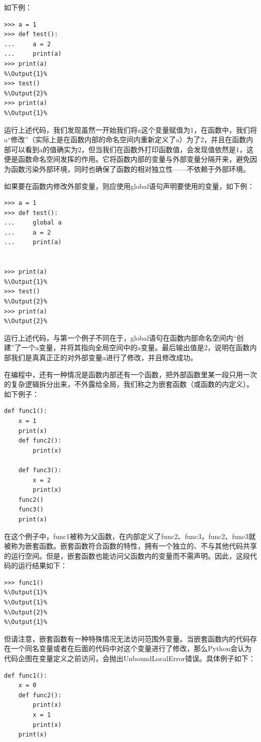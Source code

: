 \documentclass[../../Main.tex]{subfiles}
\begin{document}
如下例：
\begin{lstlisting}
>>> a = 1
>>> def test():
...     a = 2
...     print(a)
>>> print(a)
%\Output{1}%
>>> test()
%\Output{2}%
>>> print(a)
%\Output{1}%
\end{lstlisting}

运行上述代码，我们发现虽然一开始我们将a这个变量赋值为1，在函数中，我们将a“修改”（实际上是在函数内部的命名空间内重新定义了a）为了2，并且在函数内部可以看到a的值确实为2，但当我们在函数外打印函数值，会发现值依然是1，这便是函数命名空间发挥的作用。它将函数内部的变量与外部变量分隔开来，避免因为函数污染外部环境，同时也确保了函数的相对独立性——不依赖于外部环境。

如果要在函数内修改外部变量，则应使用global语句声明要使用的变量，如下例：
\begin{lstlisting}
>>> a = 1
>>> def test():
...     global a
...     a = 2
...     print(a)


>>> print(a)
%\Output{1}%
>>> test()
%\Output{2}%
>>> print(a)
%\Output{2}%
\end{lstlisting}

运行上述代码，与第一个例子不同在于，global语句在函数内部命名空间内“创建”了一个a变量，并将其指向全局空间中的a变量。最后输出值是2，说明在函数内部我们是真真正正的对外部变量a进行了修改，并且修改成功。

在编程中，还有一种情况是函数内部还有一个函数，把外部函数里某一段只用一次的复杂逻辑拆分出来，不外露给全局，我们称之为嵌套函数（或函数的内定义）。如下例子：
\begin{lstlisting}
def func1():
    x = 1
    print(x)
    def func2():
        print(x)

    def func3():
        x = 2
        print(x)
    func2()
    func3()
    print(x)
\end{lstlisting}

在这个例子中，func1被称为父函数，在内部定义了func2、func3，func2、func3就被称为嵌套函数。嵌套函数符合函数的特性，拥有一个独立的、不与其他代码共享的运行空间。但是，嵌套函数也能访问父函数内的变量而不需声明。因此，这段代码的运行结果如下：
\begin{lstlisting}
>>> func1()
%\Output{1}%
%\Output{1}%
%\Output{2}%
%\Output{1}%
\end{lstlisting}

但请注意，嵌套函数有一种特殊情况无法访问范围外变量。当嵌套函数内的代码存在一个同名变量或者在后面的代码中对这个变量进行了修改，那么Python会认为代码企图在变量定义之前访问，会抛出UnboundLocalError错误。具体例子如下：
\begin{lstlisting}
def func1():
    x = 0
    def func2():
        print(x)
        x = 1
        print(x)
    print(x)
\end{lstlisting}
\end{document}

